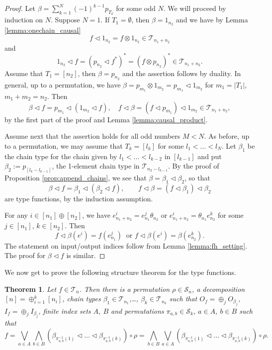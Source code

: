 \documentclass[12pt]{article}
\newtheorem{theorem}{Theorem}
\theoremstyle{definition}
\theoremstyle{remark}
\def\Te{\mathcal T}
\def\permut{\mathscr{S}}
\def\vtl{\vartriangleleft}
\begin{document}
\begin{proof} Let  $\beta=\sum_{k=1}^{N}(-1)^{k-1}p_{T_k}$
for some odd $N$. We will proceed by induction on $N$. Suppose $N=1$. If $T_1=\emptyset$,
then $\beta=1_{n_2}$ and we have by Lemma \ref{lemma:onechain_causal}
\[
f\vtl 1_{n_2}=f\otimes 1_{n_2}\in \Te_{n_1+n_2}
\]
and
\[
1_{n_2}\vtl f=(p_{n_2}\vtl f^*)^*=(f\otimes p_{n_2})^*\in \Te_{n_1+n_2}.
\]
Assume that  $T_1=[n_2]$, then $\beta=p_{n_2}$ and the assertion follows by duality. 
In general,  up to a permutation, we have $\beta=p_{m_1}\otimes
1_{m_2}=p_{m_1}\vtl 1_{m_2}$ for $m_1=|T_1|$, $m_1+m_2=n_2$. Then 
\[
\beta\vtl f=p_{m_1}\vtl (1_{m_2}\vtl f),\quad f\vtl \beta=(f\vtl p_{m_1})\vtl 1_{m_2} \in
\Te_{n_1+n_2},
\]
by the first part of the proof and Lemma \ref{lemma:causal_product}.

Assume next that the assertion holds for all odd numbers $M<N$. As before, up to a
permutation, we may assume that $T_k=[l_k]$ for some $l_1<\dots<l_{N}$. Let $\beta_1$ be the chain
type for the chain given by $l_1<\dots<l_{k-2}$ in $[l_{k-1}]$ and put
$\beta_2:=p_{[l_{k}-l_{k-1}]}$, the 1-element chain type in $\Te_{n_2-l_{k-1}}$. By the proof of Proposition \ref{prop:append_chains}, we see
that $\beta=\beta_1\vtl\beta_2$, so that 
\[
\beta\vtl f=\beta_1\vtl(\beta_2\vtl f),\qquad f\vtl\beta=(f\vtl\beta_1)\vtl\beta_2
\]
are type functions, by the induction assumption. 


For any $i\in [n_1]\oplus [n_2]$, we have  $e^i_{n_1+n_2}=e^j_{n_1}\theta_{n_2}$ or
$e^i_{n_1+n_2}=\theta_{n_1}e^k_{n_2}$
for some $j\in [n_1]$, $k\in [n_2]$. Then   
\[
f\vtl\beta(e^i)=f(e^j_{n_1})\ \text{ or } f\vtl \beta(e^i)=\beta(e^k_{n_2}).
\]
The statement on input/output indices  follow from Lemma \ref{lemma:fh_setting}. The proof
for $\beta\vtl f$ is similar. 

\end{proof}



We now get to prove the following structure theorem for the type functions.


\begin{theorem}\label{thm:structure}
Let  $f\in \Te_n$. Then there is a permutation $\rho\in \permut_n$, a decomposition
$[n]=\oplus_{i=1}^k[n_i]$, chain types 
$\beta_1\in \Te_{n_1}$,\dots, $\beta_k\in
\Te_{n_k}$ such that $O_f=\oplus_j O_{\beta_j}$, $I_f=\oplus_j I_{\beta_j}$, finite index sets $A$, $B$ and permutations $\pi_{a,b}\in
\permut_k$, $a\in A$, $b\in B$ such that 
\[
f=\bigvee_{a\in A}\bigwedge_{b\in B} (\beta_{\pi^{-1}_{a,b}(1)}\vtl \dots \vtl
\beta_{\pi^{-1}_{a,b}(k)})\circ \rho=\bigwedge_{b\in B}\bigvee_{a\in A}(\beta_{\pi^{-1}_{a,b}(1)}\vtl \dots \vtl
\beta_{\pi^{-1}_{a,b}(k)})\circ \rho.
\]
%
\end{theorem}
\end{document}
